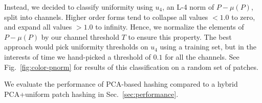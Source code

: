 Instead, we decided to classify uniformity using $u_4$, an L-4 norm
of $P-\mu(P)$, split into channels. Higher order forms tend
to collapse all values $< 1.0$ to zero, and expand all values $> 1.0$
to infinity. Hence, we normalize the elements of $P-\mu(P)$ by
our channel threshold $T$ to ensure this property. The best
approach would pick uniformity thresholds on $u_4$ using
a training set, but in the interests of time we hand-picked
a threshold of $0.1$ for all the channels. See Fig.~\ref{fig:color-pnorm}
for results of this classification on a random set of patches.

We evaluate the performance of PCA-based hashing compared to
a hybrid PCA+uniform patch hashing in Sec.~\ref{sec:performance}.
